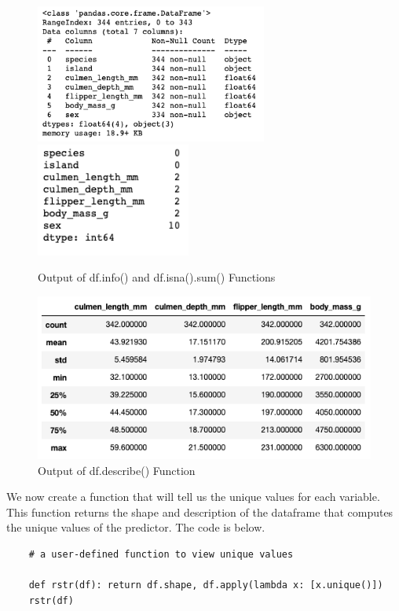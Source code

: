 \documentclass[12pt]{article}
\begin{document}
\begin{figure}[H]
    \centering
    \includegraphics[width=3in]{Figures/penguins/df.info().png}
    \includegraphics[width=2in]{Figures/penguins/df.isna().sum().png}
    \caption{Output of df.info() and df.isna().sum() Functions}
    \label{fig_df.info()_df.isna().sum()}
\end{figure}

\begin{figure}[H]
    \centering
    \includegraphics[width=5in]{Figures/penguins/df.describe().png}
    \caption{Output of df.describe() Function}
    \label{fig_df.describe()}
\end{figure}

We now create a function that will tell us the unique values for each variable. This function returns the shape and description of the dataframe that computes the unique values of the predictor. The code is below.

\begin{verbatim}
    # a user-defined function to view unique values

    def rstr(df): return df.shape, df.apply(lambda x: [x.unique()])
    rstr(df)
\end{verbatim}
\end{document}
